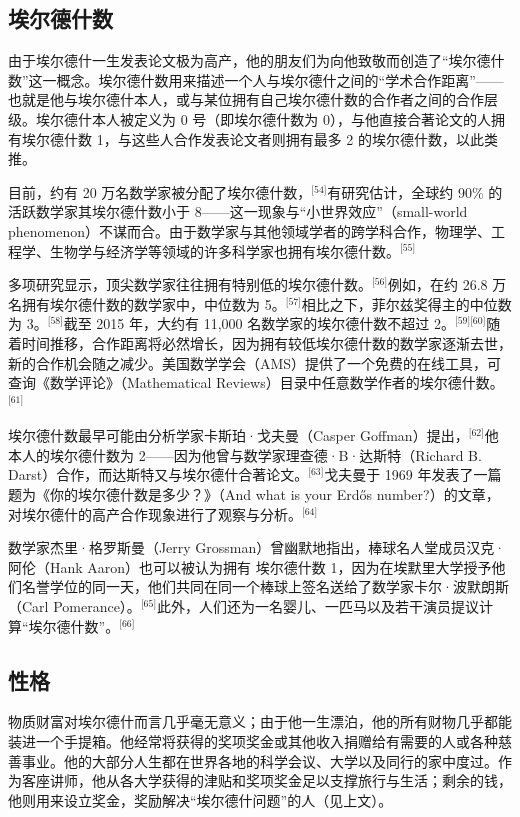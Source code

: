 \subsection{埃尔德什数}
由于埃尔德什一生发表论文极为高产，他的朋友们为向他致敬而创造了“埃尔德什数”这一概念。埃尔德什数用来描述一个人与埃尔德什之间的“学术合作距离”——也就是他与埃尔德什本人，或与某位拥有自己埃尔德什数的合作者之间的合作层级。埃尔德什本人被定义为 0 号（即埃尔德什数为 0），与他直接合著论文的人拥有埃尔德什数 1，与这些人合作发表论文者则拥有最多 2 的埃尔德什数，以此类推。

目前，约有 20 万名数学家被分配了埃尔德什数，\(^\text{[54]}\)有研究估计，全球约 90\% 的活跃数学家其埃尔德什数小于 8——这一现象与“小世界效应”（small-world phenomenon）不谋而合。由于数学家与其他领域学者的跨学科合作，物理学、工程学、生物学与经济学等领域的许多科学家也拥有埃尔德什数。\(^\text{[55]}\)

多项研究显示，顶尖数学家往往拥有特别低的埃尔德什数。\(^\text{[56]}\)例如，在约 26.8 万名拥有埃尔德什数的数学家中，中位数为 5。\(^\text{[57]}\)相比之下，菲尔兹奖得主的中位数为 3。\(^\text{[58]}\)截至 2015 年，大约有 11,000 名数学家的埃尔德什数不超过 2。\(^\text{[59][60]}\)随着时间推移，合作距离将必然增长，因为拥有较低埃尔德什数的数学家逐渐去世，新的合作机会随之减少。美国数学学会（AMS）提供了一个免费的在线工具，可查询《数学评论》（Mathematical Reviews）目录中任意数学作者的埃尔德什数。\(^\text{[61]}\)

埃尔德什数最早可能由分析学家卡斯珀·戈夫曼（Casper Goffman）提出，\(^\text{[62]}\)他本人的埃尔德什数为 2——因为他曾与数学家理查德·B·达斯特（Richard B. Darst）合作，而达斯特又与埃尔德什合著论文。\(^\text{[63]}\)戈夫曼于 1969 年发表了一篇题为《你的埃尔德什数是多少？》（And what is your Erdős number?）的文章，对埃尔德什的高产合作现象进行了观察与分析。\(^\text{[64]}\)

数学家杰里·格罗斯曼（Jerry Grossman）曾幽默地指出，棒球名人堂成员汉克·阿伦（Hank Aaron）也可以被认为拥有 埃尔德什数 1，因为在埃默里大学授予他们名誉学位的同一天，他们共同在同一个棒球上签名送给了数学家卡尔·波默朗斯（Carl Pomerance）。\(^\text{[65]}\)此外，人们还为一名婴儿、一匹马以及若干演员提议计算“埃尔德什数”。\(^\text{[66]}\)
\subsection{性格}
物质财富对埃尔德什而言几乎毫无意义；由于他一生漂泊，他的所有财物几乎都能装进一个手提箱。他经常将获得的奖项奖金或其他收入捐赠给有需要的人或各种慈善事业。他的大部分人生都在世界各地的科学会议、大学以及同行的家中度过。作为客座讲师，他从各大学获得的津贴和奖项奖金足以支撑旅行与生活；剩余的钱，他则用来设立奖金，奖励解决“埃尔德什问题”的人（见上文）。

